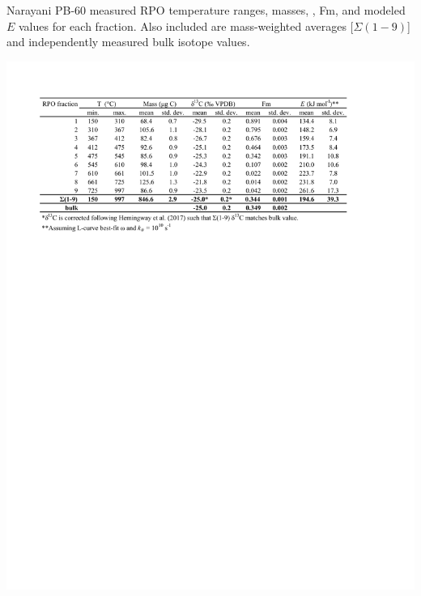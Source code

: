 \begin{table}
	\caption[Narayani PB-60 RPO results]{Narayani PB-60 measured RPO temperature ranges,  masses, , Fm, and modeled $E$ values for each fraction. Also included are mass-weighted averages [$\Sigma(1-9)$] and independently measured bulk isotope values.}
	\centering
		\includegraphics{Thesis_Tables/Ch3Tab2}
	\label{Ch3Tab:2} 
\end{table}

